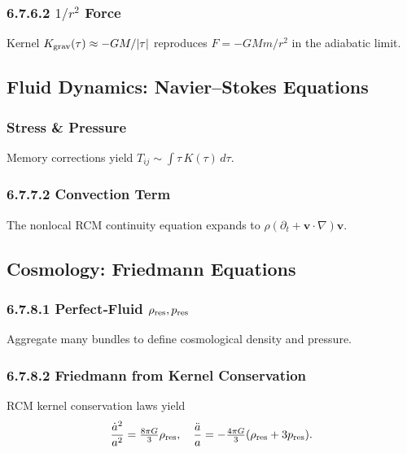 \subsubsection*{6.7.6.2 \(1/r^2\) Force}

Kernel \(K_{\rm grav}(\tau)\approx -GM/|\tau|\) reproduces
\(F=-GMm/r^2\) in the adiabatic limit.

\medskip

\subsection{Fluid Dynamics: Navier–Stokes Equations}

\subsubsection{Stress & Pressure}

Memory corrections yield
\(T_{ij}\sim\int\tau\,K(\tau)\,d\tau\).

\subsubsection*{6.7.7.2 Convection Term}

The nonlocal RCM continuity equation expands to
\(\rho(\partial_t + \mathbf v\!\cdot\!\nabla)\mathbf v\).

\medskip

\subsection{Cosmology: Friedmann Equations}

\subsubsection*{6.7.8.1 Perfect‐Fluid \(\rho_{\rm res},p_{\rm res}\)}

Aggregate many bundles to define cosmological density and pressure.

\subsubsection*{6.7.8.2 Friedmann from Kernel Conservation}

RCM kernel conservation laws yield
\[
\frac{\dot a^2}{a^2}=\tfrac{8\pi G}{3}\rho_{\rm res},\quad
\frac{\ddot a}{a}=-\tfrac{4\pi G}{3}(\rho_{\rm res}+3p_{\rm res}).
\]

\medskip

